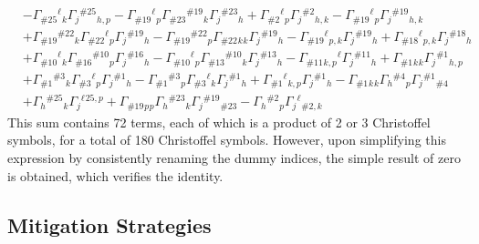 \begin{example}
\begin{equation*}
\begin{aligned}
      & -\Gamma_{\# 25}{ }^{\ell}{ }_k \Gamma_j{ }^{\# 25}{ }_{h, p}-\Gamma_{\# 19}{ }^{\ell}{ }_p \Gamma_{\# 23}{ }^{\# 19}{ }_k \Gamma_j{ }^{\# 23}{ }_h+\Gamma_{\# 2}{ }^{\ell}{ }_p \Gamma_j{ }^{\# 2}{ }_{h, k}-\Gamma_{\# 19}{ }^{\ell}{ }_p \Gamma_j{ }^{\# 19}{ }_{h, k} \\
      & +\Gamma_{\# 19}{ }^{\# 22}{ }_k \Gamma_{\# 22}{ }^{\ell}{ }_p \Gamma_j{ }^{\# 19}{ }_h-\Gamma_{\# 19}{ }^{\# 22}{ }_p \Gamma_{\# 22}{ }_k{ }_k \Gamma_j{ }^{\# 19}{ }_h-\Gamma_{\# 19}{ }^{\ell}{ }_{p, k} \Gamma_j{ }^{\# 19}{ }_h+\Gamma_{\# 18}{ }^{\ell}{ }_{p, k} \Gamma_j{ }^{\# 18}{ }_h \\
      & +\Gamma_{\# 10}{ }^{\ell}{ }_k \Gamma_{\# 16}{ }^{\# 10}{ }_p \Gamma_j{ }^{\# 16}{ }_h-\Gamma_{\# 10}{ }^{\ell}{ }_p \Gamma_{\# 13}{ }^{\# 10}{ }_k \Gamma_j{ }^{\# 13}{ }_h-\Gamma_{\# 11}{ }_{k, p}{ }^{\ell} \Gamma_j{ }^{\# 11}{ }_h+\Gamma_{\# 1}{ }_k{ }_k \Gamma_j{ }^{\# 1}{ }_{h, p} \\
      & +\Gamma_{\# 1}{ }^{\# 3}{ }_k \Gamma_{\# 3}{ }^{\ell}{ }_p \Gamma_j{ }^{\# 1}{ }_h-\Gamma_{\# 1}{ }^{\# 3}{ }_p \Gamma_{\# 3}{ }^{\ell}{ }_k \Gamma_j{ }^{\# 1}{ }_h+\Gamma_{\# 1}{ }^{\ell}{ }_{k, p} \Gamma_j{ }^{\# 1}{ }_h-\Gamma_{\# 1}{ }_k{ }_k \Gamma_h{ }^{\# 4}{ }_p \Gamma_j{ }^{\# 1}{ }_{\# 4} \\
      & +\Gamma_h{ }^{\# 25}{ }_k \Gamma_j{ }^{\ell}{ }^{25, p}+\Gamma_{\# 19}{ }_p{ }_p \Gamma_h{ }^{\# 23}{ }_k \Gamma_j{ }^{\# 19}{ }_{\# 23}-\Gamma_h{ }^{\# 2}{ }_p \Gamma_j{ }^{\ell}{ }_{\# 2, k}
    \end{aligned}
\end{equation*}
  This sum contains 72 terms, each of which is a product of 2 or 3 Christoffel symbols, for a total of 180 Christoffel symbols. However, upon simplifying this expression by consistently renaming the dummy indices, the simple result of zero is obtained, which verifies the identity.
\end{example}

\subsection{Mitigation Strategies}


